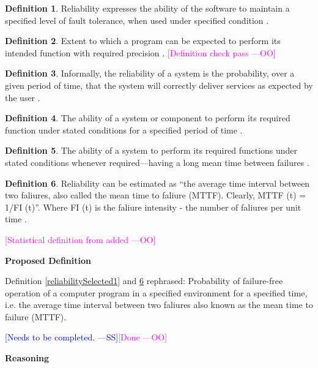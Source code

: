 \documentclass[letterpaper,cleveref]{lipics-v2019}
\newcommand{\authornote}[3]{\textcolor{#1}{[#3 ---#2]}}
\newcommand{\authornote}[3]{}
\newcommand{\wss}[1]{\authornote{blue}{SS}{#1}} %
\newcommand{\oo}[1]{\authornote{magenta}{OO}{#1}} %
\theoremstyle{definition}
\newtheorem{defn}{Definition}
\begin{document}
\begin{defn}
  Reliability expresses the ability of the software to maintain a specified
  level of fault tolerance, when used under specified condition
  \citep{singh2013different}.
\end{defn}

\begin{defn}
  Extent to which a program can be expected to perform its intended function
  with required precision \citep{McCallEtAl1977}. \oo{Definition check pass}
\end{defn}

\begin{defn}
  Informally, the reliability of a system is the probability, over a given
  period of time, that the system will correctly deliver services as expected by
  the user \citep{sommerville}.
\end{defn}
	
\begin{defn}
  The ability of a system or component to perform its required function under
  stated conditions for a specified period of time
  \citep{IEEEComputerDictionary1991}.
\end{defn}

\begin{defn}
  The ability of a system to perform its required functions under stated
  conditions whenever required—having a long mean time between failures
  \citep{mcconnell2004code}.
\end{defn}
\begin{defn} \label{reliabilitySelected2} Reliability can be estimated as ``the
  average time interval between two faliures, also called the mean time to
  faliure (MTTF). Clearly, MTTF (t) = 1/FI (t)''. Where FI (t) is the faliure
  intensity - the number of faliures per unit time \citep{GhezziEtAl2003}.
\end{defn}
\oo{Statistical definition from  \citep{GhezziEtAl2003} added}
  

\noindent \textbf{Proposed Definition}

Definition \ref{reliabilitySelected1} and \ref{reliabilitySelected2} rephrased:
Probability of failure-free operation of a computer program in a specified
environment for a specified time, i.e. the average time interval between two
faliures also known as the mean time to failure (MTTF).

\wss{Needs to be completed.}\oo{Done}

\noindent \textbf{Reasoning}
\end{document}
